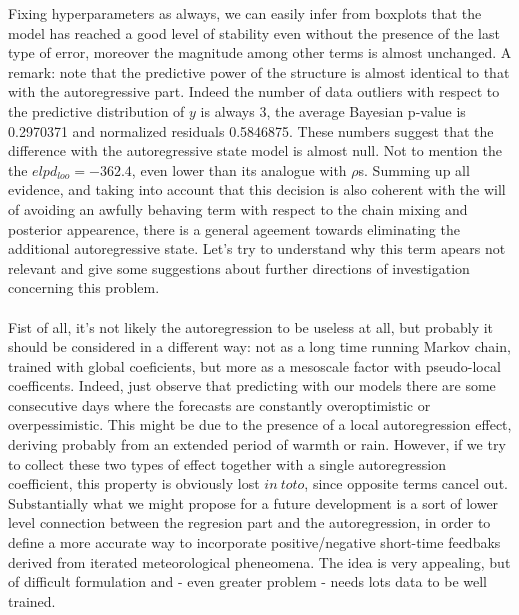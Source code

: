 \documentclass[11pt,twoside]{report}
\begin{document}
Fixing hyperparameters as always, we can easily infer from boxplots that the model has reached a good level of stability even without the presence of the last type of error, moreover the magnitude among other terms is almost unchanged. A remark: note that the predictive power of the structure is almost identical to that with the autoregressive part. Indeed the number of data outliers with respect to the predictive distribution of $ y $ is always 3, the average Bayesian p-value is 0.2970371 and normalized residuals 0.5846875. These numbers suggest that the difference with the autoregressive state model is almost null. Not to mention the the $ elpd_{loo}=-362.4 $, even lower than its analogue with $ \rho $s. Summing up all evidence, and taking into account that this decision is also coherent with the will of avoiding an awfully behaving term with respect to the chain mixing and posterior appearence, there is a general ageement towards eliminating the additional autoregressive state. Let's try to understand why this term apears not relevant and give some suggestions about further directions of investigation concerning this problem.\\
\\
Fist of all, it's not likely the autoregression to be useless at all, but probably it should be considered in a different way: not as a long time running Markov chain, trained with global coeficients, but more as a mesoscale factor with pseudo-local coefficents. Indeed, just observe that predicting with our models there are some consecutive days where the forecasts are constantly overoptimistic or overpessimistic. This might be due to the presence of a local autoregression effect, deriving probably from an extended period of warmth or rain. However, if we try to collect these two types of effect together with a single autoregression coefficient, this property is obviously lost $ in\ toto $, since opposite terms cancel out. Substantially what we might propose for a future development is a sort of lower level connection  between the regresion part and the autoregression, in  order to define a more accurate way to incorporate positive/negative short-time feedbaks derived from iterated meteorological pheneomena. The idea is very appealing, but of difficult formulation and - even greater problem - needs lots data to be well trained.\\
\\
\end{document}
